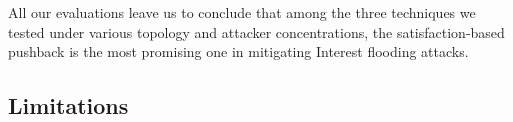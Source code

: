 \documentclass[10pt,conference]{IEEEtran}
\begin{document}
{All our evaluations leave us to conclude that among the three techniques we tested under various topology and attacker concentrations, the satisfaction-based pushback is the most promising one in mitigating Interest flooding attacks.%




% 

\subsection{Limitations}


}
\end{document}
